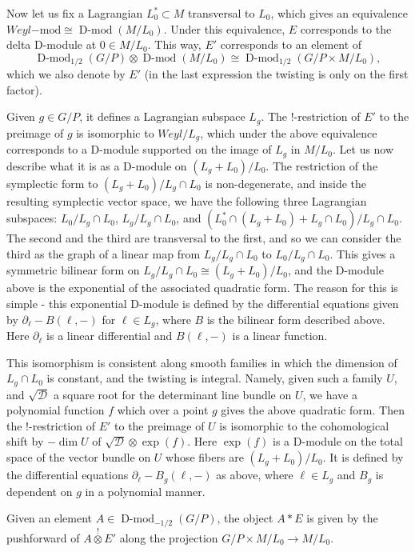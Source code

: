 \documentclass[11pt]{article}
\begin{document}
Now let us fix a Lagrangian $L_0^*\subset M$ transversal to $L_0$, which gives an equivalence $Weyl\mathrm{-mod}\cong \operatorname{D-mod}(M/L_0)$. Under this equivalence, $E$ corresponds to the delta D-module at $0\in M/L_0$.
This way, $E'$ corresponds to an element of $$\operatorname{D-mod}_{1/2}(G/P)\otimes \operatorname{D-mod}(M/L_0)\cong \operatorname{D-mod}_{1/2}(G/P\times M/L_0),$$ which we also denote by $E'$ (in the last expression the twisting is only on the first factor).

Given $g\in G / P$, it defines a Lagrangian subspace $L_g$.
The !-restriction of $E'$ to the preimage of $g$ is isomorphic to $Weyl / L_g$, which under the above equivalence corresponds to a D-module supported on the image of $L_g$ in $M/L_0$. Let us now describe what it is as a D-module on $(L_g + L_0) / L_0$.
The restriction of the symplectic form to $(L_g + L_0) / L_g\cap L_0$ is non-degenerate, and inside the resulting symplectic vector space, we have the following three Lagrangian subspaces: $L_0 / L_g\cap L_0$, $L_g / L_g\cap L_0$, and $(L_0^*\cap (L_g + L_0) + L_g\cap L_0) / L_g\cap L_0$. The second and the third are transversal to the first, and so we can consider the third as the graph of a linear map from $L_g/ L_g\cap L_0$ to $L_0/ L_g\cap L_0$.
This gives a symmetric bilinear form on $L_g/ L_g\cap L_0\cong (L_g + L_0) / L_0$, and the D-module above is the exponential of the associated quadratic form.
The reason for this is simple - this exponential D-module is defined by the differential equations given by $\partial_\ell - B(\ell,-)$ for $\ell\in L_g$, where $B$ is the bilinear form described above. Here $\partial_\ell$ is a linear differential and $B(\ell,-)$ is a linear function.

This isomorphism is consistent along smooth families in which the dimension of $L_g\cap L_0$ is constant, and the twisting is integral. Namely, given such a family $U$, and $\sqrt{\mathcal{D}}$ a square root for the determinant line bundle on $U$, we have a polynomial function $f$ which over a point $g$ gives the above quadratic form. Then the !-restriction of $E'$ to the preimage of $U$ is isomorphic to the cohomological shift by $-\dim U$ of $\sqrt{\mathcal{D}}\otimes \exp(f)$. Here $\exp(f)$ is a D-module on the total space of the vector bundle on $U$ whose fibers are $(L_g + L_0) / L_0$. It is defined by the differential equations $\partial_\ell - B_g(\ell, -)$ as above, where $\ell\in L_g$ and $B_g$ is dependent on $g$ in a polynomial manner.

Given an element $A\in \operatorname{D-mod}_{-1/2}(G/P)$, the object $A*E$ is given by the pushforward of $A\stackrel{!}{\otimes} E'$ along the projection $G/P\times M/L_0\to M/L_0$.
\end{document}
